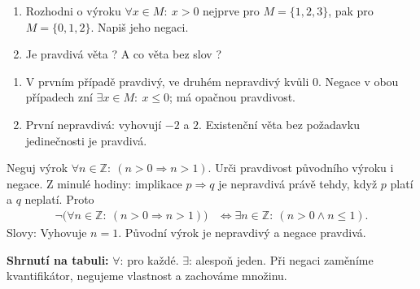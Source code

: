 \documentclass[11pt,a4paper]{article}
\begin{document}



\begin{zadaniReseniBox}[title={Rozšíření 1},breakable=false]
\begin{enumerate}[label=\alph*)]
\item Rozhodni o výroku $\forall x\in M:\ x>0$ nejprve pro $M=\{1,2,3\}$, pak pro $M=\{0,1,2\}$. Napiš jeho negaci.
\item Je pravdivá věta ? A co věta bez slov ?
\end{enumerate}
\tcblower
\begin{enumerate}[label=\alph*)]
\item V prvním případě pravdivý, ve druhém nepravdivý kvůli $0$. Negace v obou případech zní $\exists x\in M:\ x\le0$; má opačnou pravdivost.
\item První nepravdivá: vyhovují $-2$ a $2$. Existenční věta bez požadavku jedinečnosti je pravdivá.
\end{enumerate}
\end{zadaniReseniBox}

\begin{prikladReseniBox}[title={Příklad 4}]
Neguj výrok $\forall n\in\mathbb{Z}:\ (n>0\Rightarrow n>1)$.
Urči pravdivost původního výroku i negace.
\tcblower
Z minulé hodiny: implikace $p\Rightarrow q$ je nepravdivá právě tehdy,
když $p$ platí a $q$ neplatí. Proto
\begin{align*}
 \neg\bigl(\forall n\in\mathbb{Z}:\ (n>0\Rightarrow n>1)\bigr)
 &\Leftrightarrow \exists n\in\mathbb{Z}:\ (n>0\land n\leq1).
\end{align*}
Slovy:  Vyhovuje $n=1$. Původní výrok je nepravdivý a negace pravdivá.
\end{prikladReseniBox}


\textbf{Shrnutí na tabuli:} $\forall$: pro každé.
$\exists$: alespoň jeden. Při negaci zaměníme kvantifikátor,
negujeme vlastnost a zachováme množinu.
\end{document}

